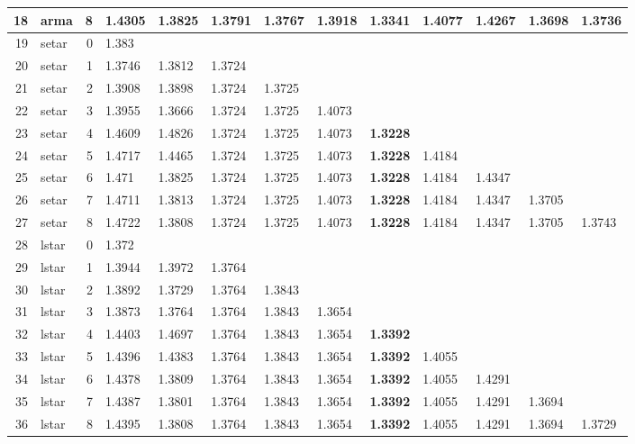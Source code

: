 \documentclass[10pt,a4paper]{article}
\begin{document}
\begin{table}[ht]
\begin{tabular}{rlrllllllllll}
  18 & arma &     8 & 1.4305 & 1.3825 & 1.3791 & 1.3767 & 1.3918 & \textbf{1.3341} & 1.4077 & 1.4267 & 1.3698 & 1.3736 \\ 
   \hline
19 & setar &     0 & 1.383 &  &  &  &  &  &  &  &  &  \\ 
  20 & setar &     1 & 1.3746 & 1.3812 & 1.3724 &  &  &  &  &  &  &  \\ 
  21 & setar &     2 & 1.3908 & 1.3898 & 1.3724 & 1.3725 &  &  &  &  &  &  \\ 
  22 & setar &     3 & 1.3955 & 1.3666 & 1.3724 & 1.3725 & 1.4073 &  &  &  &  &  \\ 
  23 & setar &     4 & 1.4609 & 1.4826 & 1.3724 & 1.3725 & 1.4073 & \textbf{1.3228} &  &  &  &  \\ 
  24 & setar &     5 & 1.4717 & 1.4465 & 1.3724 & 1.3725 & 1.4073 & \textbf{1.3228} & 1.4184 &  &  &  \\ 
  25 & setar &     6 & 1.471 & 1.3825 & 1.3724 & 1.3725 & 1.4073 & \textbf{1.3228} & 1.4184 & 1.4347 &  &  \\ 
  26 & setar &     7 & 1.4711 & 1.3813 & 1.3724 & 1.3725 & 1.4073 & \textbf{1.3228} & 1.4184 & 1.4347 & 1.3705 &  \\ 
  27 & setar &     8 & 1.4722 & 1.3808 & 1.3724 & 1.3725 & 1.4073 & \textbf{1.3228} & 1.4184 & 1.4347 & 1.3705 & 1.3743 \\ 
   \hline
28 & lstar &     0 & 1.372 &  &  &  &  &  &  &  &  &  \\ 
  29 & lstar &     1 & 1.3944 & 1.3972 & 1.3764 &  &  &  &  &  &  &  \\ 
  30 & lstar &     2 & 1.3892 & 1.3729 & 1.3764 & 1.3843 &  &  &  &  &  &  \\ 
  31 & lstar &     3 & 1.3873 & 1.3764 & 1.3764 & 1.3843 & 1.3654 &  &  &  &  &  \\ 
  32 & lstar &     4 & 1.4403 & 1.4697 & 1.3764 & 1.3843 & 1.3654 & \textbf{1.3392} &  &  &  &  \\ 
  33 & lstar &     5 & 1.4396 & 1.4383 & 1.3764 & 1.3843 & 1.3654 & \textbf{1.3392} & 1.4055 &  &  &  \\ 
  34 & lstar &     6 & 1.4378 & 1.3809 & 1.3764 & 1.3843 & 1.3654 & \textbf{1.3392} & 1.4055 & 1.4291 &  &  \\ 
  35 & lstar &     7 & 1.4387 & 1.3801 & 1.3764 & 1.3843 & 1.3654 & \textbf{1.3392} & 1.4055 & 1.4291 & 1.3694 &  \\ 
  36 & lstar &     8 & 1.4395 & 1.3808 & 1.3764 & 1.3843 & 1.3654 & \textbf{1.3392} & 1.4055 & 1.4291 & 1.3694 & 1.3729 \\ 

\end{tabular}
\end{table}
\end{document}
